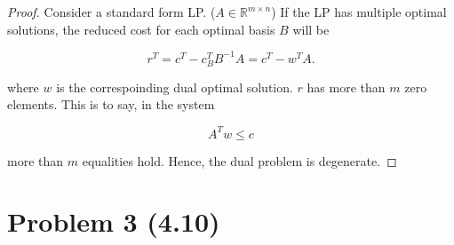 \documentclass[12pt]{article}
\begin{document}
\begin{proof}

Consider a standard form LP. ($A\in \mathbb R^{m\times n}$) If the LP has multiple optimal solutions, the reduced cost for each optimal basis $B$ will be 

$$
r^T = c^T - c_B^T B^{-1} A = c^T - w^T A.
$$

where $w$ is the correspoinding dual optimal solution. $r$ has more than $m$ zero elements. This is to say, in the system 

$$
A^Tw \leqslant c
$$

more than $m$ equalities hold. Hence, the dual problem is degenerate.

\end{proof}

\section*{Problem 3 (4.10)}
\end{document}
